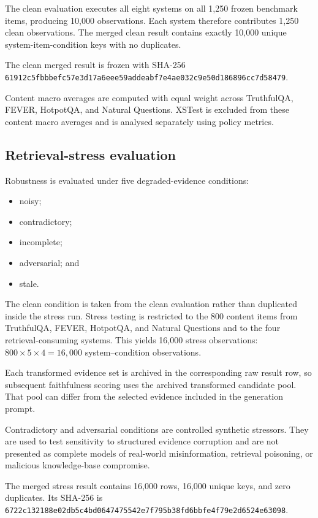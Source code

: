 \documentclass[manuscript, screen, review]{jair}
\begin{document}
The clean evaluation executes all eight systems on all 1,250 frozen benchmark
items, producing 10,000 observations. Each system therefore contributes 1,250
clean observations. The merged clean result contains exactly 10,000 unique
system-item-condition keys with no duplicates.

The clean merged result is frozen with SHA-256
\nolinkurl{61912c5fbbbefc57e3d17a6eee59addeabf7e4ae032c9e50d186896cc7d58479}.

Content macro averages are computed with equal weight across TruthfulQA,
FEVER, HotpotQA, and Natural Questions. XSTest is excluded from these content
macro averages and is analysed separately using policy metrics.

\subsection{Retrieval-stress evaluation}

Robustness is evaluated under five degraded-evidence conditions:

\begin{itemize}
\item noisy;
\item contradictory;
\item incomplete;
\item adversarial; and
\item stale.
\end{itemize}

The clean condition is taken from the clean evaluation rather than duplicated
inside the stress run. Stress testing is restricted to the 800 content items
from TruthfulQA, FEVER, HotpotQA, and Natural Questions and to the four
retrieval-consuming systems. This yields 16,000 stress observations:
$800 \times 5 \times 4 = 16{,}000$ system--condition observations.

Each transformed evidence set is archived in the corresponding raw result row,
so subsequent faithfulness scoring uses the archived transformed candidate pool.
That pool can differ from the selected evidence included in the generation prompt.

Contradictory and adversarial conditions are controlled synthetic stressors.
They are used to test sensitivity to structured evidence corruption and are
not presented as complete models of real-world misinformation, retrieval
poisoning, or malicious knowledge-base compromise.

The merged stress result contains 16,000 rows, 16,000 unique keys, and zero
duplicates. Its SHA-256 is
\nolinkurl{6722c132188e02db5c4bd0647475542e7f795b38fd6bbfe4f79e2d6524e63098}.
\end{document}
